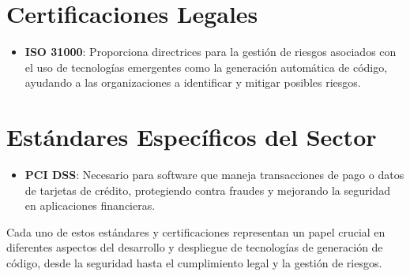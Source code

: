 \section{Certificaciones Legales}
\begin{itemize}
    \item \textbf{ISO 31000}: Proporciona directrices para la gestión de riesgos asociados con el uso de tecnologías emergentes como la generación automática de código, ayudando a las organizaciones a identificar y mitigar posibles riesgos. \cite{ISO31000_2024}
\end{itemize}

\section{Estándares Específicos del Sector}
\begin{itemize}
    \item \textbf{PCI DSS}: Necesario para software que maneja transacciones de pago o datos de tarjetas de crédito, protegiendo contra fraudes y mejorando la seguridad en aplicaciones financieras. \cite{PCIDSS2024}
\end{itemize}

Cada uno de estos estándares y certificaciones representan un papel crucial en diferentes aspectos del desarrollo y despliegue de tecnologías de generación de código, desde la seguridad hasta el cumplimiento legal y la gestión de riesgos.



